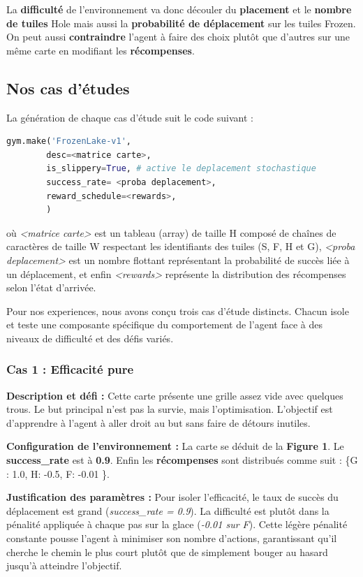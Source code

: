 \documentclass{article}
\begin{document}
La \textbf{difficulté} de l'environnement va donc découler du \textbf{placement} et le \textbf{nombre de tuiles} Hole mais aussi la \textbf{probabilité de déplacement} sur les tuiles Frozen. On peut aussi \textbf{contraindre} l'agent à faire des choix plutôt que d'autres sur une même carte en modifiant les \textbf{récompenses}.
\subsection{Nos cas d'études}
La génération de chaque cas d'étude suit le code suivant :
\begin{lstlisting}[language=Python]
gym.make('FrozenLake-v1',
        desc=<matrice carte>,
        is_slippery=True, # active le deplacement stochastique
        success_rate= <proba deplacement>,
        reward_schedule=<rewards>,
        )
\end{lstlisting}
où \textit{<matrice carte>} est un tableau (array) de taille H composé de chaînes de caractères de taille W respectant les identifiants des tuiles (S, F, H et G), \textit{<proba deplacement>} est un nombre flottant représentant la probabilité de succès liée à un déplacement, et enfin \textit{<rewards>} représente la distribution des récompenses selon l'état d'arrivée.

Pour nos experiences, nous avons conçu trois cas d'étude distincts. Chacun isole et teste une composante spécifique du comportement de l'agent face à des niveaux de difficulté et des défis variés.

\subsubsection{Cas 1 : Efficacité pure}

\textbf{Description et défi :} Cette carte présente une grille assez vide avec quelques trous. Le but principal n'est pas la survie, mais l'optimisation. L'objectif est d'apprendre à l'agent à aller droit au but sans faire de détours inutiles. 

\textbf{Configuration de l'environnement :}
La carte se déduit de la \textbf{Figure 1}. Le \textbf{success\_rate} est à \textbf{0.9}. Enfin les \textbf{récompenses} sont distribués comme suit : \{G : 1.0, H: -0.5, F: -0.01 \}.


\textbf{Justification des paramètres :} Pour isoler l'efficacité, le taux de succès du déplacement est grand (\textit{success\_rate = 0.9}). La difficulté est plutôt dans la pénalité appliquée à chaque pas sur la glace (\textit{-0.01 sur F}). Cette légère pénalité constante pousse l'agent à minimiser son nombre d'actions, garantissant qu'il cherche le chemin le plus court plutôt que de simplement bouger au hasard jusqu'à atteindre l'objectif.
\end{document}
